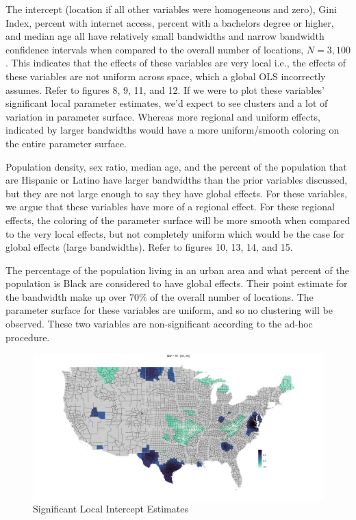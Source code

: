 \documentclass[
]{article}
\begin{document}
The intercept (location if all other variables were homogeneous and
zero), Gini Index, percent with internet access, percent with a
bachelors degree or higher, and median age all have relatively small
bandwidths and narrow bandwidth confidence intervals when compared to
the overall number of locations, \(N = 3,100\). This indicates that the
effects of these variables are very local i.e., the effects of these
variables are not uniform across space, which a global OLS incorrectly
assumes. Refer to figures 8, 9, 11, and 12. If we were to plot these
variables' significant local parameter estimates, we'd expect to see
clusters and a lot of variation in parameter surface. Whereas more
regional and uniform effects, indicated by larger bandwidths would have
a more uniform/smooth coloring on the entire parameter surface.

Population density, sex ratio, median age, and the percent of the
population that are Hispanic or Latino have larger bandwidths than the
prior variables discussed, but they are not large enough to say they
have global effects. For these variables, we argue that these variables
have more of a regional effect. For these regional effects, the coloring
of the parameter surface will be more smooth when compared to the very
local effects, but not completely uniform which would be the case for
global effects (large bandwidths). Refer to figures 10, 13, 14, and 15.

The percentage of the population living in an urban area and what
percent of the population is Black are considered to have global
effects. Their point estimate for the bandwidth make up over \(70\%\) of
the overall number of locations. The parameter surface for these
variables are uniform, and so no clustering will be observed. These two
variables are non-significant according to the ad-hoc procedure.

\newpage

\begin{figure}[H]

{\centering \includegraphics[width=1\linewidth]{images/local-param/sig-intercept} 

}

\caption{Significant Local Intercept Estimates}\label{fig:unnamed-chunk-12}
\end{figure}
\end{document}
